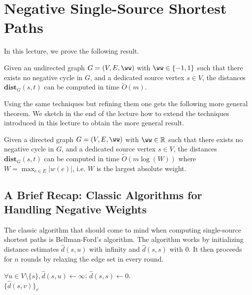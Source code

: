 \chapter{Negative Single-Source Shortest Paths}

In this lecture, we prove the following result.

\begin{theorem}
Given an undirected graph $G=(V,E, \ww)$ with $\ww \in \{-1, 1\}$ such that there exists no negative cycle in $G$,  and a dedicated source vertex $s \in V$, the distances $\mathbf{dist}_G(s,t)$ can be computed in time $\tilde{O}(m)$.
\end{theorem}


Using the same techniques but refining them one gets the following more general theorem. We sketch in the end of the lecture how to extend the techniques introduced in this lecture to obtain the more general result.

\begin{theorem}
Given a directed graph $G=(V,E, \ww)$ with $\ww \in \mathbb{R}$ such that there exists no negative cycle in $G$,  and a dedicated source vertex $s \in V$, the distances $\mathbf{dist}_G(s,t)$ can be computed in time $\tilde{O}(m \log(W))$ where  $W = \max_{e \in E} |w(e)|$, i.e. $W$ is the largest absolute weight.
\end{theorem}

\section{A Brief Recap: Classic Algorithms for Handling Negative Weights}

The classic algorithm that should come to mind when computing single-source shortest paths is Bellman-Ford's algorithm. The algorithm works by initializing distance estimates $\hat{d}(s, u)$ with infinity and $\hat{d}(s,s)$ with $0$. It then proceeds for $n$ rounds by relaxing the edge set in every round.  

\begin{algorithm}
$\forall u \in V \setminus \{s\}, \hat{d}(s, u) \gets \infty$; $\hat{d}(s,s) \gets 0$.\\
\Return $\{\hat{d}(s, v) \}_v$
\caption{$\textsc{BellmanFord}(G,s)$}
\end{algorithm}

